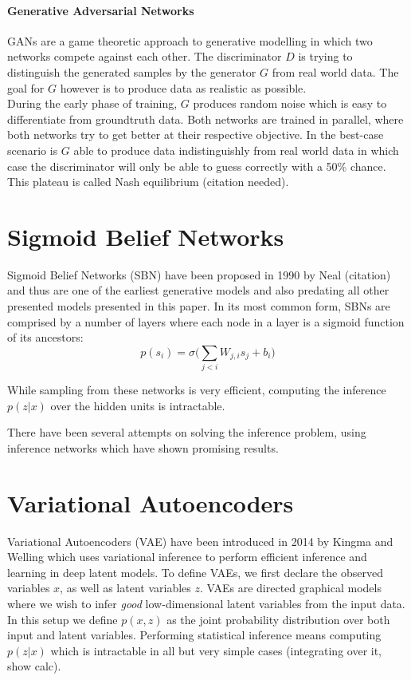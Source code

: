 \documentclass[twoside,11pt,a4paper]{article}
\theoremstyle{break}
\begin{document}




\paragraph{Generative Adversarial Networks}
\label{par:overview_gan}
GANs are a game theoretic approach to generative modelling
in which two networks compete against each other.
The discriminator $D$ is trying to distinguish the generated samples
by the generator $G$ from real world data.
The goal for $G$ however is to produce data as realistic as possible.\\
During the early phase of training, $G$ produces random noise which
is easy to differentiate from groundtruth data.
Both networks are trained in parallel, where both networks try to get better
at their respective objective.
In the best-case scenario is $G$ able to produce data indistinguishly from real world data in which
case the discriminator will only be able to guess correctly with a 50\% chance.
This plateau is called Nash equilibrium (citation needed).






\section{Sigmoid Belief Networks}
\label{sec:sbn}
Sigmoid Belief Networks (SBN) have been proposed in 1990 by Neal (citation) and thus are one of the earliest generative models and also predating all other presented models presented in this paper.
In its most common form, SBNs are comprised by a number of layers where each node in a layer is a sigmoid function of its ancestors:
$$
p(s_i) = \sigma\bigg(\sum_{j<i}W_{j,i}s_j+b_i\bigg)
$$

While sampling from these networks is very efficient, computing the inference $p(z|x)$ over the hidden units is intractable.

There have been several attempts on solving the inference problem, using inference networks which have shown promising results.


\section{Variational Autoencoders}
\label{sec:vae}
Variational Autoencoders (VAE) have been introduced in 2014 by Kingma and Welling which uses variational inference to perform efficient inference and learning in deep latent models.
To define VAEs, we first declare the observed variables $x$, as well as latent variables $z$.
VAEs are directed graphical models where we wish to infer \emph{good} low-dimensional latent variables from the input data.
In this setup we define $p(x,z)$ as the joint probability distribution over both input and latent variables.
Performing statistical inference means computing $p(z|x)$ which is intractable in all but very simple cases (integrating over it, show calc).
 
\end{document}
